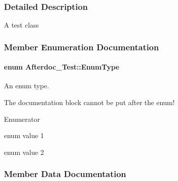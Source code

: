 \subsubsection{Detailed Description}
A test class 

\subsubsection{Member Enumeration Documentation}
\paragraph[{\texorpdfstring{Enum\+Type}{EnumType}}]{\setlength{\rightskip}{0pt plus 5cm}enum {\bf Afterdoc\+\_\+\+Test\+::\+Enum\+Type}}\hypertarget{class_afterdoc___test_adab0cd7ad3b4875e245ca8f6238a388a}{}\label{class_afterdoc___test_adab0cd7ad3b4875e245ca8f6238a388a}


An enum type. 

The documentation block cannot be put after the enum! \begin{Desc}
\item[Enumerator]\par
\begin{description}
\item[{\em 
E\+Val1\hypertarget{class_afterdoc___test_adab0cd7ad3b4875e245ca8f6238a388aae054276790e35692ad0abe10c5b75da4}{}\label{class_afterdoc___test_adab0cd7ad3b4875e245ca8f6238a388aae054276790e35692ad0abe10c5b75da4}
}]enum value 1 \item[{\em 
E\+Val2\hypertarget{class_afterdoc___test_adab0cd7ad3b4875e245ca8f6238a388aac849f37624d8d2d68ca72c4a8df9cf99}{}\label{class_afterdoc___test_adab0cd7ad3b4875e245ca8f6238a388aac849f37624d8d2d68ca72c4a8df9cf99}
}]enum value 2 \end{description}
\end{Desc}


\subsubsection{Member Data Documentation}
